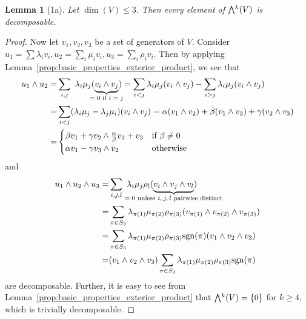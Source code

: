 \documentclass{scrartcl}
\newcommand{\sgn}{\mathrm{sgn}}
\newcommand{\extpow}{\mathchoice{{\textstyle\bigwedge}}
    {{\bigwedge}}
    {{\textstyle\wedge}}
    {{\scriptstyle\wedge}}}
\newtheorem{lemma}[definition]{Lemma}
\begin{document}
\begin{lemma}[1a]
    Let $\dim(V) \leq 3$. Then every element of $\extpow^k(V)$ is decomposable.
\end{lemma}
\begin{proof}
    Now let $v_1, v_2, v_3$ be a set of generators of $V$.
    Consider $u_1 = \sum \lambda_i v_i, u_2 = \sum_i \mu_i v_i, u_3 = \sum_i \rho_i v_i$.
    Then by applying Lemma~\ref{prop:basic_properties_exterior_product}, we see that 
    \begin{align*}
        u_1 \wedge u_2 =& \sum_{i, j} \ \lambda_i \mu_j (\underbrace{v_i \wedge v_j}_{\mathclap{\text{$= 0$ if $i = j$}}}) = \sum_{i < j} \lambda_i \mu_j (v_i \wedge v_j) - \sum_{i > j} \lambda_i \mu_j (v_i \wedge v_j) \\
        =& \sum_{i < j} (\lambda_i \mu_j - \lambda_j \mu_i)(v_i \wedge v_j) = \alpha (v_1 \wedge v_2) + \beta (v_1 \wedge v_3) + \gamma (v_2 \wedge v_3) \\
        =& \begin{cases}
            \beta v_1 + \gamma v_2 \wedge \frac \alpha \beta v_2 + v_3 & \text{if $\beta \neq 0$} \\
            \alpha v_1 - \gamma v_3 \wedge v_2 & \text{otherwise}
        \end{cases}
    \end{align*}
    and
    \begin{align*}
        u_1 \wedge u_2 \wedge u_3 =& \sum_{i, j, l} \ \lambda_i \mu_j \rho_l (\underbrace{v_i \wedge v_j \wedge v_l}_{\mathclap{\text{$= 0$ unless $i, j, l$ pairwise distinct}}}) \\
        =& \sum_{\pi \in S_3} \lambda_{\pi(1)} \mu_{\pi(2)} \rho_{\pi(3)} (v_{\pi(1)} \wedge v_{\pi(2)} \wedge v_{\pi(3)}) \\
        =& \sum_{\pi \in S_3} \lambda_{\pi(1)} \mu_{\pi(2)} \rho_{\pi(3)} \sgn(\pi) (v_1 \wedge v_2 \wedge v_3) \\
        =& (v_1 \wedge v_2 \wedge v_3) \sum_{\pi \in S_3} \lambda_{\pi(1)} \mu_{\pi(2)} \rho_{\pi(3)} \sgn(\pi)
    \end{align*}
    are decomposable.
    Further, it is easy to see from Lemma~\ref{prop:basic_properties_exterior_product} that $\extpow^k(V) = \{ 0 \}$ for $k \geq 4$, which is trivially decomposable.
\end{proof}
\end{document}

